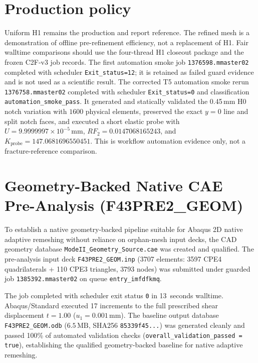 \section{Production policy}
Uniform H1 remains the production and report reference. The refined mesh is a
demonstration of offline pre-refinement efficiency, not a replacement of H1.
Fair walltime comparisons should use the four-thread H1 closeout package and the
frozen C2F-v3 job records. The first automation smoke job
\texttt{1376598.mmaster02} completed with scheduler \texttt{Exit\_status=12};
it is retained as failed guard evidence and is not used as a scientific result.
The corrected T5 automation smoke rerun \texttt{1376758.mmaster02} completed
with scheduler \texttt{Exit\_status=0} and classification
\texttt{automation\_smoke\_pass}. It generated and statically validated the
0.45\,mm H0 notch variation with $1600$ physical elements, preserved the exact
$y=0$ line and split notch faces, and executed a short elastic probe with
$U=9.9999997\times 10^{-5}\,\mathrm{mm}$, $RF_2=0.0147068165243$, and
$K_\mathrm{probe}=147.0681696550451$. This is workflow automation evidence
only, not a fracture-reference comparison.

\section{Geometry-Backed Native CAE Pre-Analysis (F43PRE2\_GEOM)}
To establish a native geometry-backed pipeline suitable for Abaqus 2D native adaptive remeshing without reliance on orphan-mesh input decks, the CAD geometry database \texttt{ModeII\_Geometry\_Source.cae} was created and qualified. The pre-analysis input deck \texttt{F43PRE2\_GEOM.inp} (3707 elements: 3597 CPE4 quadrilaterals + 110 CPE3 triangles, 3793 nodes) was submitted under guarded job \texttt{1385392.mmaster02} on queue \texttt{entry\_imfdfkmq}.

The job completed with scheduler exit status \texttt{0} in 13~seconds walltime. Abaqus/Standard executed 17 increments to the full prescribed shear displacement $t=1.00$ ($u_1 = 0.001\,\mathrm{mm}$). The baseline output database \texttt{F43PRE2\_GEOM.odb} ($6.5\,\mathrm{MB}$, SHA256 \texttt{85339f45...}) was generated cleanly and passed 100\% of automated validation checks (\texttt{overall\_validation\_passed = true}), establishing the qualified geometry-backed baseline for native adaptive remeshing.

